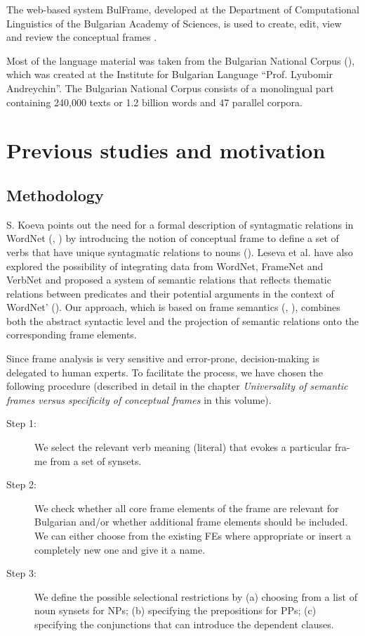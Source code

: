 \documentclass[output=paper,colorlinks,citecolor=brown]{langscibook}
\begin{document}
The web-based system BulFrame, developed at the Department of Computational Linguistics of the Bulgarian Academy of Sciences, is used to create, edit, view and review the conceptual frames \citep{koeva-doychev-2022-ontology}.

Most of the language material was taken from the Bulgarian National Corpus (\cite{Koeva2012}), which was created at the Institute for Bulgarian Language ``Prof. Lyubomir Andreychin''. The Bulgarian National Corpus consists of a monolingual part containing 240,000 texts or 1.2 billion words and 47 parallel corpora.

\section{Previous studies and motivation} \label{ch6:sec:3}


\subsection{Methodology}


S. Koeva points out the need for a formal description of syntagmatic relations in WordNet (\cite{Fellbaum1998}, \cite{koeva2021a}) by introducing the notion of conceptual frame to define a set of verbs that have unique syntagmatic relations to nouns (\cite [182]{svetla2021towards}). Leseva et al. have also explored the possibility of integrating data from WordNet, FrameNet and VerbNet and proposed a system of semantic relations that reflects thematic relations between predicates and their potential arguments in the context of WordNet' (\cite{leseva2018integrating}). Our approach, which is based on frame semantics (\cite{Baker1998}, \cite{Koeva2010FN}), combines both the abstract syntactic level and the projection of semantic relations onto the corresponding frame elements.

Since frame analysis is very sensitive and error-prone, decision-making is delegated to human experts. To facilitate the process, we have chosen the following procedure (described in detail in the chapter \textit{Universality of semantic frames versus specificity of conceptual frames} in this volume).


\begin{description}
\item[Step 1:] We select the relevant verb meaning (literal) that evokes a particular fra-me from a set of synsets.
\item[Step 2:] We check whether all core frame elements of the frame are relevant for Bulgarian and/or whether additional frame elements should be included. We can either choose from the existing FEs where appropriate or insert a completely new one and give it a name.
\item[Step 3:] We define the possible selectional restrictions by (a) choosing from a list of noun synsets for NPs; (b) specifying the prepositions for PPs; (c) specifying the conjunctions that can introduce the dependent clauses.
\end{description}
\end{document}
